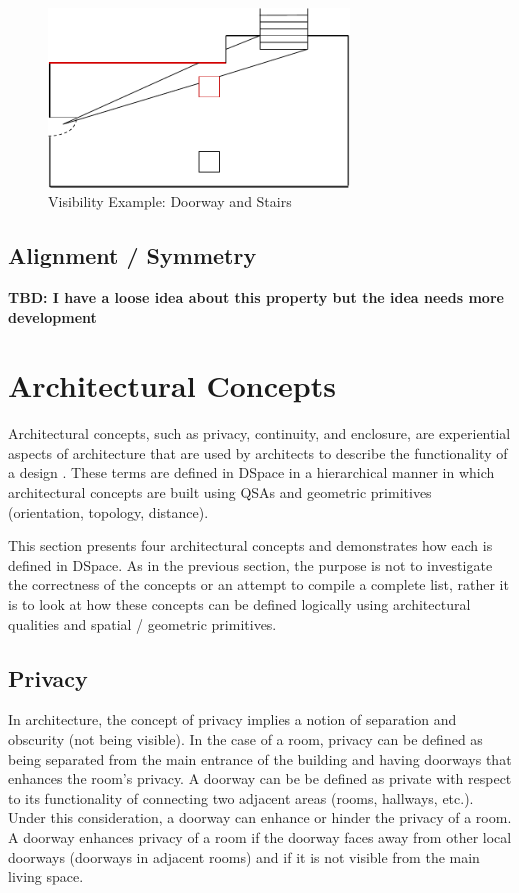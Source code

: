 \documentclass[12pt]{ucthesis}
\begin{document}
\begin{figure}[H]
\centering
\includegraphics[width=80mm]{visibility-stair-door}
\caption{Visibility Example: Doorway and Stairs}
\label{visibility-door-stair}
\end{figure}

\subsection{Alignment / Symmetry}

{\bf TBD: I have a loose idea about this property but the idea needs more development}


\section{Architectural Concepts}
Architectural concepts, such as privacy, continuity, and enclosure, are experiential aspects of architecture that are used by architects to describe the functionality of a design \cite{Koile}. These terms are defined in DSpace in a hierarchical manner in which architectural concepts are built using QSAs and geometric primitives (orientation, topology, distance). 

This section presents four architectural concepts and demonstrates how each is defined in DSpace. As in the previous section, the purpose is not to investigate the correctness of the concepts or an attempt to compile a complete list, rather it is to look at how these concepts can be defined logically using architectural qualities and spatial / geometric primitives.

\subsection{Privacy}
In architecture, the concept of privacy implies a notion of separation and obscurity (not being visible). In the case of a room, privacy can be defined as being separated from the main entrance of the building and having doorways that enhances the room's privacy. A doorway can be be defined as private with respect to its functionality of connecting two adjacent areas (rooms, hallways, etc.). Under this consideration, a doorway can enhance or hinder the privacy of a room. A doorway enhances privacy of a room if the doorway faces away from other local doorways (doorways in adjacent rooms) and if it is not visible from the main living space. 
\end{document}

